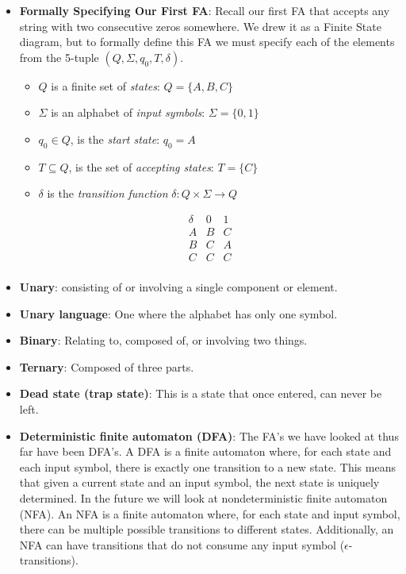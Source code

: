 \documentclass{report}
\begin{document}
\begin{itemize}
\begin{itemize}
    \end{itemize}
    \item \textbf{Formally Specifying Our First FA}:
        \bigbreak \noindent 
        \bigbreak \noindent 
        Recall our first FA that accepts any string with two consecutive zeros somewhere.
        \bigbreak \noindent 
        We drew it as a Finite State diagram, but to formally define this FA we must specify each of the elements from the 5-tuple $(Q, \Sigma, q_0, T, \delta)$.
        \begin{itemize}
            \item $Q$ is a finite set of \textit{states}: \hspace{0.2cm} $Q = \{A, B, C\}$
            \item $\Sigma$ is an alphabet of \textit{input symbols}: \hspace{0.2cm} $\Sigma = \{0, 1\}$
            \item $q_0 \in Q$, is the \textit{start state}: \hspace{0.2cm} $q_0 = A$
            \item $T \subseteq Q$, is the set of \textit{accepting states}: \hspace{0.2cm} $T = \{C\}$
            \item $\delta$ is the \textit{transition function} $\delta: Q \times \Sigma \rightarrow Q$
        \end{itemize}
        \[
            \begin{array}{c|cc}
                \delta & \text{0} & \text{1} \\
                \hline
                A & B & C \\
                B & C & A \\
                C & C & C \\
            \end{array}
        \]
    \item \textbf{Unary}: consisting of or involving a single component or element.
    \item \textbf{Unary language}: One where the alphabet has only one symbol.
    \item \textbf{Binary}: Relating to, composed of, or involving two things.
    \item \textbf{Ternary}: Composed of three parts.
    \item \textbf{Dead state (trap state)}: This is a state that once entered, can never be left.
    \item \textbf{Deterministic finite automaton (DFA)}: The FA's we have looked at thus far have been DFA's. A DFA is a finite automaton where, for each state and each input symbol, there is exactly one transition to a new state. This means that given a current state and an input symbol, the next state is uniquely determined. In the future we will look at nondeterministic finite automaton (NFA). An NFA is a finite automaton where, for each state and input symbol, there can be multiple possible transitions to different states. Additionally, an NFA can have transitions that do not consume any input symbol ($\epsilon$-transitions).

\end{itemize}
\end{document}
